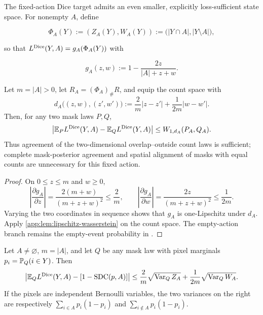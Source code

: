 The fixed-action Dice target admits an even smaller, explicitly loss-sufficient
state space.  For nonempty $A$, define

\begin{equation*}
  \Phi_A(Y):=(Z_A(Y),W_A(Y))
  :=\bigl(|Y\cap A|,|Y\setminus A|\bigr),
\end{equation*}

so that $L^{\operatorname{Dice}}(Y,A)=g_A(\Phi_A(Y))$ with

\begin{equation*}
  g_A(z,w):=1-\frac{2z}{|A|+z+w}.
\end{equation*}

\begin{proposition}
\label{app:prop:dice-count-pushforward}
Let $m=|A|>0$, let $R_A=(\Phi_A)_\#R$, and equip the count space with
\begin{equation*}
  d_A\bigl((z,w),(z',w')\bigr)
  :=\frac{2}{m}|z-z'|+\frac{1}{2m}|w-w'|.
\end{equation*}
Then, for any two mask laws $P,Q$,
\begin{equation*}
  \left|
    \mathbb{E}_P L^{\operatorname{Dice}}(Y,A)-\mathbb{E}_Q L^{\operatorname{Dice}}(Y,A)
  \right|
  \leq W_{1,d_A}(P_A,Q_A).
\end{equation*}
Thus agreement of the two-dimensional overlap--outside count laws is
sufficient; complete mask-posterior agreement and spatial alignment of masks
with equal counts are unnecessary for this fixed action.
\end{proposition}

\begin{proof}
On $0\leq z\leq m$ and $w\geq0$,
\begin{equation*}
  \left|\frac{\partial g_A}{\partial z}\right|
  =\frac{2(m+w)}{(m+z+w)^2}\leq\frac{2}{m},
  \qquad
  \left|\frac{\partial g_A}{\partial w}\right|
  =\frac{2z}{(m+z+w)^2}\leq\frac{1}{2m}.
\end{equation*}
Varying the two coordinates in sequence shows that $g_A$ is one-Lipschitz
under $d_A$. Apply \cref{app:lem:lipschitz-wasserstein} on the count
space.  The empty-action branch remains the empty-event probability in
.
\end{proof}

\begin{corollary}
\label{app:cor:sdc-count-dispersion}
Let $A\neq\varnothing$, $m=|A|$, and let $Q$ be any mask law with
pixel marginals $p_i=\mathbb{P}_Q(i\in Y)$. Then
\begin{equation*}
  \left|
    \mathbb{E}_Q L^{\operatorname{Dice}}(Y,A)-[1-\operatorname{SDC}(p,A)]
  \right|
  \leq
  \frac{2}{m}\sqrt{\operatorname{Var}_Q Z_A}
  +\frac{1}{2m}\sqrt{\operatorname{Var}_Q W_A}.
\end{equation*}
If the pixels are independent Bernoulli variables, the two variances on the
right are respectively
$\sum_{i\in A}p_i(1-p_i)$ and
$\sum_{i\notin A}p_i(1-p_i)$.
\end{corollary}

